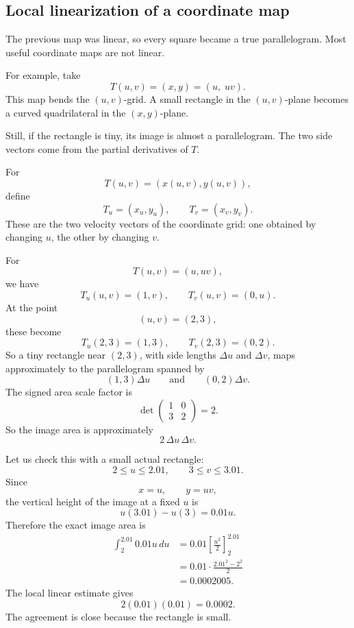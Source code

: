 \subsection{Local linearization of a coordinate map}

The previous map was linear, so every square became a true parallelogram.  Most useful
coordinate maps are not linear.

For example, take
\[
    T(u,v)=(x,y)=(u,\;uv).
\]
This map bends the \((u,v)\)-grid.  A small rectangle in the \((u,v)\)-plane becomes a
curved quadrilateral in the \((x,y)\)-plane.

Still, if the rectangle is tiny, its image is almost a parallelogram.  The two side vectors
come from the partial derivatives of \(T\).

For
\[
    T(u,v)=(x(u,v),y(u,v)),
\]
define
\[
    T_u=(x_u,y_u),
    \qquad
    T_v=(x_v,y_v).
\]
These are the two velocity vectors of the coordinate grid: one obtained by changing
\(u\), the other by changing \(v\).

For
\[
    T(u,v)=(u,uv),
\]
we have
\[
    T_u(u,v)=(1,v),
    \qquad
    T_v(u,v)=(0,u).
\]
At the point
\[
    (u,v)=(2,3),
\]
these become
\[
    T_u(2,3)=(1,3),
    \qquad
    T_v(2,3)=(0,2).
\]
So a tiny rectangle near \((2,3)\), with side lengths \(\Delta u\) and \(\Delta v\), maps
approximately to the parallelogram spanned by
\[
    (1,3)\Delta u
    \qquad\text{and}\qquad
    (0,2)\Delta v.
\]
The signed area scale factor is
\[
    \det
    \begin{pmatrix}
        1&0\\
        3&2
    \end{pmatrix}
    =
    2.
\]
So the image area is approximately
\[
    2\,\Delta u\,\Delta v.
\]

Let us check this with a small actual rectangle:
\[
    2\le u\le2.01,
    \qquad
    3\le v\le3.01.
\]
Since
\[
    x=u,
    \qquad
    y=uv,
\]
the vertical height of the image at a fixed \(u\) is
\[
    u(3.01)-u(3)=0.01u.
\]
Therefore the exact image area is
\[
\begin{aligned}
    \int_{2}^{2.01} 0.01u\,du
    &=
    0.01\left[\frac{u^2}{2}\right]_{2}^{2.01}\\
    &=
    0.01\cdot\frac{2.01^2-2^2}{2}\\
    &=
    0.0002005.
\end{aligned}
\]
The local linear estimate gives
\[
    2(0.01)(0.01)=0.0002.
\]
The agreement is close because the rectangle is small.


